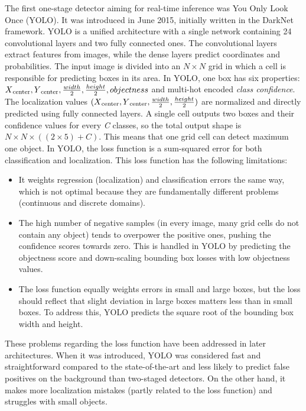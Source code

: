 The first one-stage detector aiming for real-time inference was You Only Look Once\cite{YOLO} (YOLO). It was introduced in June 2015, initially written in the DarkNet framework. YOLO is a unified architecture with a single network containing 24 convolutional layers and two fully connected ones. The convolutional layers extract features from images, while the dense layers predict coordinates and probabilities. The input image is divided into an \(N \times N\) grid in which a cell is responsible for predicting boxes in its area. In YOLO, one box has six properties: \(X\textsubscript{center}, Y\textsubscript{center}, \frac{width}{2}, \frac{height}{2}, objectness\) and multi-hot encoded \textit{class confidence}. The localization values \((X\textsubscript{center}, Y\textsubscript{center}, \frac{width}{2}, \frac{height}{2})\) are normalized and directly predicted using fully connected layers. A single cell outputs two boxes and their confidence values for every \textit{C} classes, so the total output shape is \(N \times N \times ((2 \times 5)+C)\). This means that one grid cell can detect maximum one object. In YOLO, the loss function is a sum-squared error for both classification and localization. This loss function has the following limitations:

\begin{itemize}
  \item It weights regression (localization) and classification errors the same way, which is not optimal because they are fundamentally different problems (continuous and discrete domains).
  \item The high number of negative samples (in every image, many grid cells do not contain any object) tends to overpower the positive ones, pushing the confidence scores towards zero. This is handled in YOLO by predicting the objectness score and down-scaling bounding box losses with low objectness values.
  \item The loss function equally weights errors in small and large boxes, but the loss should reflect that slight deviation in large boxes matters less than in small boxes. To address this, YOLO predicts the square root of the bounding box width and height.
\end{itemize}

These problems regarding the loss function have been addressed in later architectures. When it was introduced, YOLO was considered fast and straightforward compared to the state-of-the-art and less likely to predict false positives on the background than two-staged detectors. On the other hand, it makes more localization mistakes (partly related to the loss function) and struggles with small objects.

